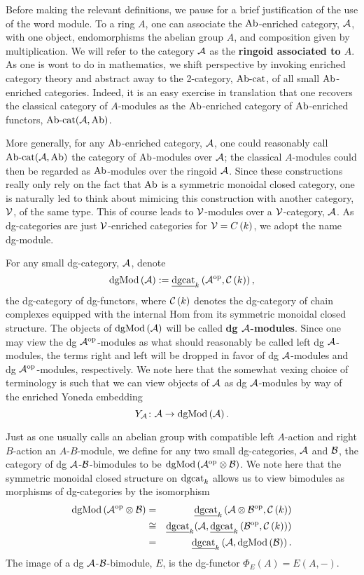 Before making the relevant definitions, we pause for a brief justification of the use of the word module.
To a ring $A$, one can associate the $\operatorname{Ab}$-enriched category, \(\mathcal{A}\), with one object, endomorphisms the abelian group $A$, and composition given by multiplication.
We will refer to the category $\mathcal{A}$ as the \textbf{ringoid associated to $A$}.
As one is wont to do in mathematics, we shift perspective by invoking enriched category theory and abstract away to the 2-category, $\operatorname{Ab-cat}$, of all small $\operatorname{Ab}$-enriched categories.
Indeed, it is an easy exercise in translation that one recovers the classical category of $A$-modules as the $\operatorname{Ab}$-enriched category of $\operatorname{Ab}$-enriched functors, $\operatorname{Ab-cat}(\mathcal{A}, \operatorname{Ab})$.

More generally, for any $\operatorname{Ab}$-enriched category, $\mathcal{A}$, one could reasonably call $\operatorname{Ab-cat}(\mathcal{A},\operatorname{Ab})$ the category of $\operatorname{Ab}$-modules over $\mathcal{A}$; the classical $A$-modules could then be regarded as $\operatorname{Ab}$-modules over the ringoid $\mathcal{A}$.
Since these constructions really only rely on the fact that $\operatorname{Ab}$ is a symmetric monoidal closed category, one is naturally led to think about mimicing this construction with another category, $\mathcal{V}$, of the same type.
This of course leads to $\mathcal{V}$-modules over a $\mathcal{V}$-category, $\mathcal{A}$.
As dg-categories are just $\mathcal{V}$-enriched categories for $\mathcal{V} = C\left(k\right)$, we adopt the name dg-module.

For any small dg-category, \(\mathcal{A}\), denote
\[\operatorname{dgMod}\left(\mathcal{A}\right) := \underline{\operatorname{dgcat}}_{k}\left(\mathcal{A}^{{\operatorname{op}}},\mathcal{C}\left(k\right)\right),\]
the dg-category of dg-functors, where \(\mathcal{C}\left(k\right)\) denotes the dg-category of chain complexes equipped with the internal Hom from its symmetric monoidal closed structure.
The objects of \(\operatorname{dgMod}\left(\mathcal{A}\right)\) will be called \textbf{dg \(\mathcal{A}\)-modules}.
Since one may view the dg \(\mathcal{A}^{{\operatorname{op}}}\)-modules as what should reasonably be called left dg \(\mathcal{A}\)-modules, the terms right and left will be dropped in favor of dg \(\mathcal{A}\)-modules and dg \(\mathcal{A}^{{\operatorname{op}}}\)-modules, respectively.
We note here that the somewhat vexing choice of terminology is such that we can view objects of \(\mathcal{A}\) as dg \(\mathcal{A}\)-modules by way of the enriched Yoneda embedding
\[Y_{\mathcal{A}} \colon \mathcal{A} \to \operatorname{dgMod}\left(\mathcal{A}\right).\]

Just as one usually calls an abelian group with compatible left $A$-action and right $B$-action an $A$-$B$-module, we define for any two small dg-categories, \(\mathcal{A}\) and \(\mathcal{B}\), the category of dg \(\mathcal{A}\)-\(\mathcal{B}\)-bimodules to be \(\operatorname{dgMod}\left(\mathcal{A}^{{\operatorname{op}}} \otimes \mathcal{B}\right)\).
We note here that the symmetric monoidal closed structure on \(\operatorname{dgcat}_k\) allows us to view bimodules as morphisms of dg-categories by the isomorphism
\begin{eqnarray*}
  \operatorname{dgMod}\left(\mathcal{A}^{{\operatorname{op}}} \otimes \mathcal{B}\right) &=& \underline{\operatorname{dgcat}}_{k}\left(\mathcal{A} \otimes \mathcal{B}^{{\operatorname{op}}}, \mathcal{C}\left(k\right)\right)\\
  &\cong& \underline{\operatorname{dgcat}}_{k}(\mathcal{A}, \underline{\operatorname{dgcat}}_{k}\left(\mathcal{B}^{{\operatorname{op}}}, \mathcal{C}\left(k\right)\right))\\
  &=& \underline{\operatorname{dgcat}}_{k}\left(\mathcal{A}, \operatorname{dgMod}\left(\mathcal{B}\right)\right).
\end{eqnarray*}
The image of a dg \(\mathcal{A}\)-\(\mathcal{B}\)-bimodule, \(E\), is the dg-functor \(\Phi_E(A) = E(A,-)\).

